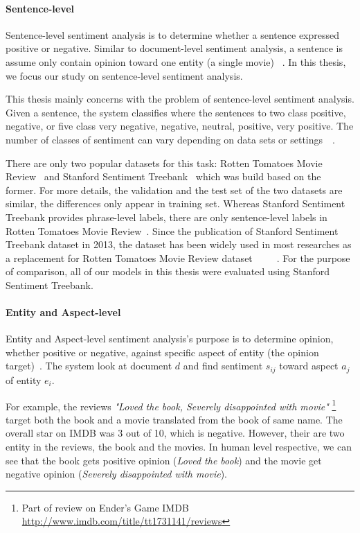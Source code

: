 \paragraph{Sentence-level}\label{sec:sent-level}
Sentence-level sentiment analysis is to determine whether a sentence expressed positive or negative. Similar to document-level sentiment analysis, a sentence is assume only contain opinion toward one entity (a single movie) ~\cite{liu2012sentiment}.
In this thesis, we focus our study on sentence-level sentiment analysis.

This thesis mainly concerns with the problem of sentence-level sentiment analysis. 
Given a sentence, the system classifies where the sentences to two class positive, negative, or five class very negative, negative, neutral, positive, very positive.
The number of classes of sentiment can vary depending on data sets or settings~\cite{Rotten-Tomato}~\cite{socher2013recursive}.

There are only two popular datasets for this task: Rotten Tomatoes Movie Review~\cite{Rotten-Tomato} and Stanford Sentiment Treebank~\cite{socher2013recursive} which was build based on the former.
For more details, the validation and the test set of the two datasets are similar, the differences only appear in training set.
Whereas Stanford Sentiment Treebank provides phrase-level labels, there are only sentence-level labels in Rotten Tomatoes Movie Review~\cite{socher2013recursive}.
Since the publication of Stanford Sentiment Treebank dataset in 2013, the dataset has been widely used in most researches as a replacement for Rotten Tomatoes Movie Review dataset~\cite{treeLSTM}~\cite{KimCNN}~\cite{cnn-rnn}~\cite{2-layer-cnn}~\cite{socher2013recursive}.
For the purpose of comparison, all of our models in this thesis were evaluated using Stanford Sentiment Treebank.

\paragraph{Entity and Aspect-level}
Entity and Aspect-level sentiment analysis's purpose is to determine opinion, whether positive or negative, against specific aspect of entity (the opinion target)~\cite{liu2012sentiment}. The system look at document $d$ and find sentiment $s_{ij}$ toward aspect $a_{j}$ of entity $e_{i}$.

For example, the reviews \textit{"Loved the book, Severely disappointed with movie"} \footnote{Part of review on Ender's Game IMDB \url{http://www.imdb.com/title/tt1731141/reviews}} target both the book and a movie translated from the book of same name. The overall star on IMDB was 3 out of 10, which is negative. However, their are two entity in the reviews, the book and the movies. In human level respective, we can see that the book gets positive opinion (\textit{Loved the book}) and the movie get negative opinion (\textit{Severely disappointed with movie}). 

